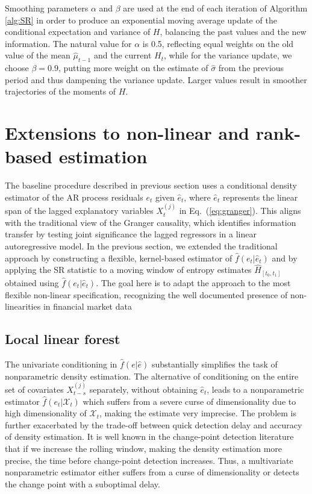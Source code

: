 Smoothing parameters $\alpha$ and $\beta$ are used at the end of each iteration of Algorithm \ref{alg:SR} in order to produce an exponential moving average update of the conditional expectation and variance of $H$, balancing the past values and the new information. The natural value for $\alpha$ is 0.5, reflecting equal weights on the old value of the mean $\hat{\mu}_{t-1}$ and the current $H_t$, while for the variance update, we choose $\beta = 0.9$, putting more weight on the estimate of $\hat{\sigma}$ from the previous period and thus dampening the variance update. Larger values result in smoother trajectories of the moments of $H$.







\section{Extensions to non-linear and rank-based estimation}\label{sec:extensions}

The baseline procedure described in previous section uses a conditional density estimator of the AR process residuals ${e}_t$ given $\hat{e}_t$, where $\hat{e}_t$ represents the linear span of the lagged explanatory variables $X_{t}^{(j)}$ in Eq.~(\ref{eq:granger}). This aligns with the traditional view of the Granger causality, which identifies information transfer by testing joint significance the lagged regressors in a linear autoregressive model. In the previous section, we extended the traditional approach by constructing a flexible, kernel-based estimator of $\hat{f}(e_t|\hat{e}_t)$ and by applying the SR statistic to a moving window of entropy estimates $\hat{H}_{[t_0, t_1]}$ obtained using $\hat{f}(e_t|\hat{e}_t)$. The goal here is to adapt the approach to the most flexible non-linear specification, recognizing the well documented presence of non-linearities in financial market data \cite[see, e.g.,][]{CAPORALE:20} 

\subsection{Local linear forest}\label{subsec:llf}

The univariate conditioning in $\hat{f}(e | \hat{e})$ substantially simplifies the task of nonparametric density estimation. The alternative of conditioning on the entire set of covariates $X_{t-s}^{(j)}$ separately, without obtaining $\hat{e}_t$, leads to a nonparametric estimator $\hat{f}(e_t | \mathcal{X}_t)$ which suffers from a severe curse of dimensionality due to high dimensionality of $\mathcal{X}_t$, making the estimate very imprecise. The problem is further  exacerbated by the trade-off between quick detection delay and accuracy of density estimation. It is well known in the change-point detection literature that if we increase the rolling window, making the density estimation more precise,  the time before change-point detection increases. Thus, a multivariate nonparametric estimator either suffers from a curse of dimensionality or detects the change point with a suboptimal delay. 

